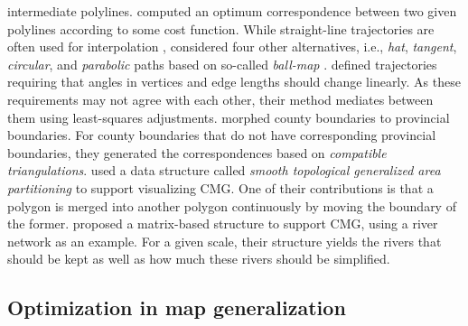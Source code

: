 \documentclass[acmsmall,natbib=false]{acmart}
\begin{document}
intermediate polylines.
\textcite{Noellenburg2008} computed an optimum
correspondence between two given polylines 
according to some cost function.
While straight-line trajectories 
are often used for interpolation
\parencite[e.g.,][]{Cecconi2003,Deng2015},
\textcite{Whited2011BallMorph} considered four other alternatives, 
i.e., \emph{hat}, \emph{tangent}, \emph{circular}, 
and \emph{parabolic} paths
based on so-called \emph{ball-map}
\parencite{Chazal2010BallMap}.
\textcite{Peng2013LSA} defined trajectories requiring that
angles in vertices and edge lengths should change linearly.
As these requirements may not agree with each other,
their method mediates between them using 
least-squares adjustments.
\textcite{Peng2016Admin} morphed county boundaries
to provincial boundaries.
For county boundaries that do not have corresponding 
provincial boundaries, they generated the correspondences based 
on \emph{compatible triangulations}.
\Textcite{vanOosterom2014Support} used
a data structure called
\emph{smooth topological generalized area partitioning}
to support visualizing CMG.
One of their contributions is that
a polygon is merged into another polygon continuously
by moving the boundary of the former.
\textcite{Huang2017Matrix} proposed a matrix-based structure 
to support CMG,
using a river network as an example.
For a given scale, 
their structure yields the rivers that should be kept 
as well as how much these rivers should be simplified.



\subsection{Optimization in map generalization}
\end{document}
